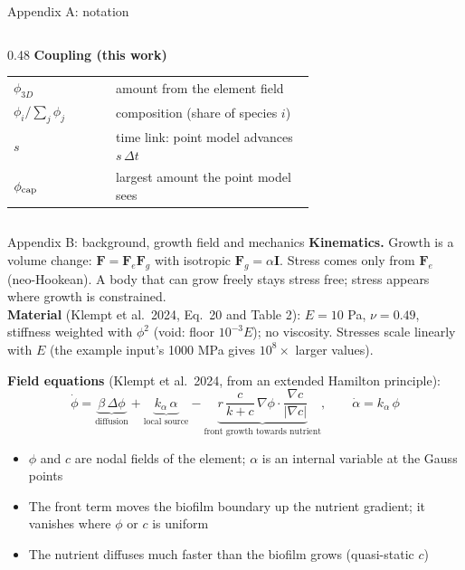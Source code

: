 \documentclass[aspectratio=169,11pt]{beamer}
\begin{document}
\begin{frame}{Appendix A: notation}
\begin{columns}[T]
\begin{column}{0.48\textwidth}
\textbf{Coupling (this work)}\\[2pt]
\begin{tabular}{@{}l>{\raggedright\arraybackslash}p{0.66\linewidth}@{}}
\toprule
$\phi_{3D}$ & amount from the element field\\
$\phi_i/\sum_j\phi_j$ & composition (share of species $i$)\\
$s$ & time link: point model advances $s\,\Delta t$\\
$\phi_{\rm cap}$ & largest amount the point model sees\\
\bottomrule
\end{tabular}
\end{column}
\end{columns}
\end{frame}

\begin{frame}{Appendix B: background, growth field and mechanics}
\small
\textbf{Kinematics.} Growth is a volume change: $\mathbf F=\mathbf F_e\mathbf F_g$ with
isotropic $\mathbf F_g=\alpha\mathbf I$. Stress comes only from $\mathbf F_e$ (neo-Hookean).
A body that can grow freely stays stress free; stress appears where growth is constrained.\\
\textbf{Material} (Klempt et al.\ 2024, Eq.\ 20 and Table 2): $E=10$ Pa, $\nu=0.49$,
stiffness weighted with $\phi^2$ (void: floor $10^{-3}E$); no viscosity.
Stresses scale linearly with $E$ (the example input's 1000 MPa gives $10^8\times$ larger values).
\vspace{4pt}

\textbf{Field equations} (Klempt et al.\ 2024, from an extended Hamilton principle):
\[
\dot\phi=\underbrace{\beta\,\Delta\phi}_{\text{diffusion}}
+\underbrace{k_\alpha\,\alpha}_{\text{local source}}
-\underbrace{r\,\frac{c}{k+c}\,\nabla\phi\cdot\frac{\nabla c}{|\nabla c|}}_{\text{front growth towards nutrient}},
\qquad
\dot\alpha=k_\alpha\,\phi
\]
\begin{itemize}
  \item $\phi$ and $c$ are nodal fields of the element; $\alpha$ is an internal
        variable at the Gauss points
  \item The front term moves the biofilm boundary up the nutrient gradient; it vanishes
        where $\phi$ or $c$ is uniform
  \item The nutrient diffuses much faster than the biofilm grows (quasi-static $c$)
\end{itemize}
\end{frame}
\end{document}
